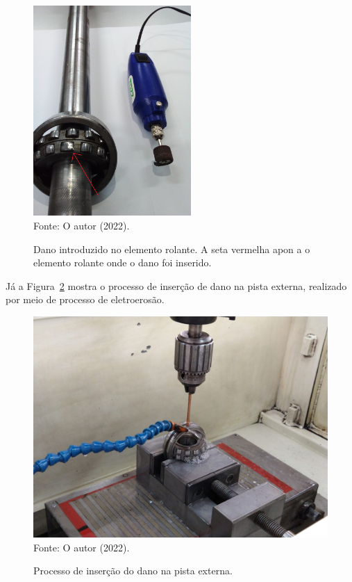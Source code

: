 \documentclass[
	12pt,				
	oneside,			
	a4paper,			
	english,			
	brazil,			
	]{abntex2ppgsi}
\begin{document}
\begin{figure}[H]
\centering
\caption {Dano introduzido no elemento rolante. A seta vermelha apon
a o elemento rolante onde o dano foi inserido.}
\includegraphics[width=\textwidth,height=80mm,keepaspectratio]{dano_introduzido_rolante} \\
Fonte: O autor (2022).
\label{dano_introduzido_rolante}
\end{figure}

Já a Figura~\ref{insercao_dano_pista_externa} mostra o processo de inserção de dano na pista externa, realizado por meio de processo de eletroerosão.

\begin{figure}[H]
\centering
\caption {Processo de inserção do dano na pista externa.}
\includegraphics[width=\textwidth,keepaspectratio]{insercao_dano_pista_externa} \\
Fonte: O autor (2022).
\label{insercao_dano_pista_externa}
\end{figure}
\end{document}
